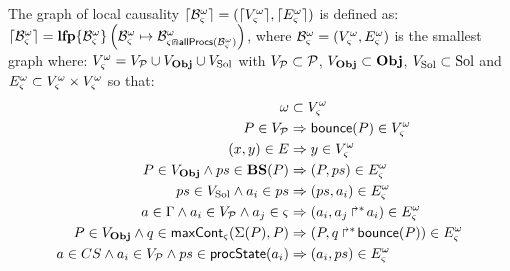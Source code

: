 \begin{definition}
  The graph of local causality $\cwB = (\Bv, \Be)$ is defined as: $\cwB = \sfp{\aB^\w_\ctx}{\myB}{\aB^\w_{\ctx \Cap \allprocs(\myB)}}$,
  where $\myB = (\cwV, \cwE)$ is the smallest graph where: $\cwV = \VProc \cup \VObj \cup \VSol$ with $\VProc \subset \PHproc$, $\VObj \subset \Obj$, $\VSol \subset \Sol$ and $\cwE \subset \cwV \times \cwV$ so that:
  \begin{align}
    \w &\subset \cwV \label{eq:Vw} \\
    P \in \VProc &\Rightarrow \PHbounce(P) \in \cwV \label{eq:Vproc} \\
    (x, y) \in \E &\Rightarrow y \in \cwV \label{eq:VE} \\
    P \in \VObj \wedge ps \in \BS(P) &\Rightarrow (P, ps) \in \cwE \label{eq:ESol1} \\
    ps \in \VSol \wedge a_i \in ps &\Rightarrow (ps, a_i) \in \cwE \label{eq:ESol2} \\
    a \in \components \wedge a_i \in \VProc \wedge a_j \in \ctx &\Rightarrow (a_i, \PHobjp{a}{j}{i}) \in \cwE \label{eq:EReq} \\
    P \in \VObj \wedge q \in \gCont_\ctx(\PHsort(P), P) &\Rightarrow (P, \PHobj{q}{\PHbounce(P)}) \in \cwE \label{eq:ECont} \\
    a \in \cs \wedge a_i \in \VProc \wedge ps \in \csState(a_i) &\Rightarrow (a_i, ps) \in \cwE \label{eq:EPrio}
  \end{align}
\end{definition}

